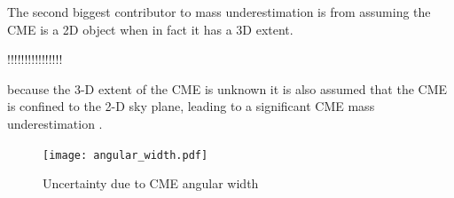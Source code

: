 

The second biggest contributor to mass underestimation is from assuming the CME is a 2D object when in fact it has a 3D extent.

!!!!!!!!!!!!!!!!

because the 3-D extent of the CME is unknown it is also assumed that the CME is confined to the 2-D sky plane, leading to a significant CME mass underestimation \citep{vou00}.
\begin{figure}[!t]
\begin{center}
\texttt{[image: angular\_width.pdf]}
\caption[Uncertainty due to CME angular width]{Uncertainty due to CME angular width}
\label{fig:ang_width_error}
\end{center}
\end{figure}





